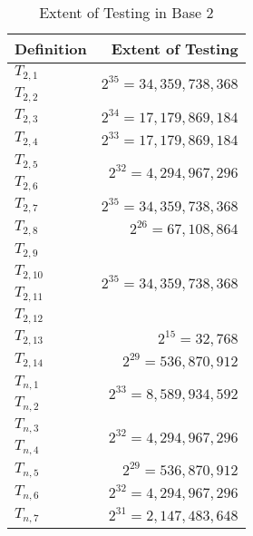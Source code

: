 \documentclass[conference]{IEEEtran}
\begin{document}
\renewcommand{\arraystretch}{1.25}
\begin{table}[H]
\label{tab:testing_b2}
\caption{Extent of Testing in Base 2}
\centering
\begin{tabular}{|l|r|}
\hline
Definition & Extent of Testing            \\ \hline
$T_{2,1}$  &\multirow{2}{*}{$2^{35}=34,359,738,368$}\\ \cline{1-1}
$T_{2,2}$  &                              \\ \hline
$T_{2,3}$  & $2^{34} = 17,179,869,184$    \\ \hline
$T_{2,4}$  & $2^{33} = 17,179,869,184$    \\ \hline
$T_{2,5}$  &\multirow{2}{*}{$2^{32}=4,294,967,296$}\\ \cline{1-1}
$T_{2,6}$  &                              \\ \hline
$T_{2,7}$  & $2^{35} = 34,359,738,368$    \\ \hline
$T_{2,8}$  & $2^{26} = 67,108,864$        \\ \hline
$T_{2,9}$  &\multirow{4}{*}{$2^{35}=34,359,738,368$}\\ \cline{1-1}
$T_{2,10}$ &                              \\ \cline{1-1}
$T_{2,11}$ &                              \\ \cline{1-1}
$T_{2,12}$ &                              \\ \hline
$T_{2,13}$ & $2^{15} = 32,768$            \\ \hline
$T_{2,14}$ & $2^{29} = 536,870,912$       \\ \hline
$T_{n,1}$  &\multirow{2}{*}{$2^{33}=8,589,934,592$}\\ \cline{1-1}
$T_{n,2}$  &                              \\ \hline
$T_{n,3}$  &\multirow{2}{*}{$2^{32}=4,294,967,296$}\\ \cline{1-1}
$T_{n,4}$  &                              \\ \hline
$T_{n,5}$  & $2^{29} = 536,870,912$       \\ \hline
$T_{n,6}$  & $2^{32} = 4,294,967,296$     \\ \hline
$T_{n,7}$  & $2^{31} = 2,147,483,648$     \\ \hline
\end{tabular}
\end{table}
\end{document}
